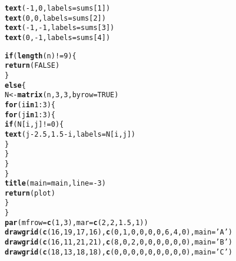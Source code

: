 \documentclass[12pt]{article}\usepackage[]{graphicx}\usepackage[]{color}
\makeatletter
\newcommand{\hlnum}[1]{\textcolor[rgb]{0.686,0.059,0.569}{#1}}%
\newcommand{\hlstr}[1]{\textcolor[rgb]{0.192,0.494,0.8}{#1}}%
\newcommand{\hlopt}[1]{\textcolor[rgb]{0,0,0}{#1}}%
\newcommand{\hlstd}[1]{\textcolor[rgb]{0.345,0.345,0.345}{#1}}%
\newcommand{\hlkwa}[1]{\textcolor[rgb]{0.161,0.373,0.58}{\textbf{#1}}}%
\newcommand{\hlkwb}[1]{\textcolor[rgb]{0.69,0.353,0.396}{#1}}%
\newcommand{\hlkwc}[1]{\textcolor[rgb]{0.333,0.667,0.333}{#1}}%
\newcommand{\hlkwd}[1]{\textcolor[rgb]{0.737,0.353,0.396}{\textbf{#1}}}%
\newenvironment{kframe}{%
 \def\at@end@of@kframe{}%
 \ifinner\ifhmode%
  \def\at@end@of@kframe{\end{minipage}}%
  \begin{minipage}{\columnwidth}%
 \fi\fi%
 \def\FrameCommand##1{\hskip\@totalleftmargin \hskip-\fboxsep
 \colorbox{shadecolor}{##1}\hskip-\fboxsep
     \hskip-\linewidth \hskip-\@totalleftmargin \hskip\columnwidth}%
 \MakeFramed {\advance\hsize-\width
   \@totalleftmargin\z@ \linewidth\hsize
   \@setminipage}}%
 {\par\unskip\endMakeFramed%
 \at@end@of@kframe}
\newenvironment{knitrout}{}{} %
\makeatother
\begin{document}
\begin{knitrout}
\begin{kframe}
\begin{alltt}
    \hlkwd{text}\hlstd{(}\hlopt{-}\hlnum{1}\hlstd{,} \hlnum{0}\hlstd{,} \hlkwc{labels} \hlstd{= sums[}\hlnum{1}\hlstd{])}
    \hlkwd{text}\hlstd{(}\hlnum{0}\hlstd{,} \hlnum{0}\hlstd{,} \hlkwc{labels} \hlstd{= sums[}\hlnum{2}\hlstd{])}
    \hlkwd{text}\hlstd{(}\hlopt{-}\hlnum{1}\hlstd{,} \hlopt{-}\hlnum{1}\hlstd{,} \hlkwc{labels} \hlstd{= sums[}\hlnum{3}\hlstd{])}
    \hlkwd{text}\hlstd{(}\hlnum{0}\hlstd{,} \hlopt{-}\hlnum{1}\hlstd{,} \hlkwc{labels} \hlstd{= sums[}\hlnum{4}\hlstd{])}

    \hlkwa{if} \hlstd{(}\hlkwd{length}\hlstd{(n)} \hlopt{!=} \hlnum{9}\hlstd{)\{}
      \hlkwd{return}\hlstd{(}\hlnum{FALSE}\hlstd{)}
    \hlstd{\}}
    \hlkwa{else}\hlstd{\{}
      \hlstd{N} \hlkwb{<-} \hlkwd{matrix}\hlstd{(n,} \hlnum{3}\hlstd{,} \hlnum{3}\hlstd{,} \hlkwc{byrow}\hlstd{=}\hlnum{TRUE}\hlstd{)}
      \hlkwa{for} \hlstd{(i} \hlkwa{in} \hlnum{1}\hlopt{:}\hlnum{3}\hlstd{)\{}
        \hlkwa{for} \hlstd{(j} \hlkwa{in} \hlnum{1}\hlopt{:}\hlnum{3}\hlstd{)\{}
          \hlkwa{if} \hlstd{(N[i, j]} \hlopt{!=} \hlnum{0}\hlstd{)\{}
            \hlkwd{text}\hlstd{(j}\hlopt{-}\hlnum{2.5}\hlstd{,} \hlnum{1.5}\hlopt{-}\hlstd{i,} \hlkwc{labels} \hlstd{= N[i, j])}
          \hlstd{\}}
        \hlstd{\}}
      \hlstd{\}}
    \hlstd{\}}
    \hlkwd{title}\hlstd{(}\hlkwc{main}\hlstd{=main,} \hlkwc{line} \hlstd{=} \hlopt{-}\hlnum{3}\hlstd{)}
    \hlkwd{return}\hlstd{(plot)}
  \hlstd{\}}
\hlstd{\}}
\hlkwd{par}\hlstd{(}\hlkwc{mfrow}\hlstd{=}\hlkwd{c}\hlstd{(}\hlnum{1}\hlstd{,} \hlnum{3}\hlstd{),} \hlkwc{mar}\hlstd{=}\hlkwd{c}\hlstd{(}\hlnum{2}\hlstd{,} \hlnum{2}\hlstd{,} \hlnum{1.5}\hlstd{,} \hlnum{1}\hlstd{))}
\hlkwd{drawgrid}\hlstd{(}\hlkwd{c}\hlstd{(}\hlnum{16}\hlstd{,} \hlnum{19}\hlstd{,} \hlnum{17}\hlstd{,} \hlnum{16}\hlstd{),} \hlkwd{c}\hlstd{(}\hlnum{0}\hlstd{,} \hlnum{1}\hlstd{,} \hlnum{0}\hlstd{,} \hlnum{0}\hlstd{,} \hlnum{0}\hlstd{,} \hlnum{0}\hlstd{,} \hlnum{6}\hlstd{,} \hlnum{4}\hlstd{,} \hlnum{0}\hlstd{),} \hlkwc{main}\hlstd{=}\hlstr{'A'}\hlstd{)}
\hlkwd{drawgrid}\hlstd{(}\hlkwd{c}\hlstd{(}\hlnum{16}\hlstd{,} \hlnum{11}\hlstd{,} \hlnum{21}\hlstd{,} \hlnum{21}\hlstd{),} \hlkwd{c}\hlstd{(}\hlnum{8}\hlstd{,} \hlnum{0}\hlstd{,} \hlnum{2}\hlstd{,} \hlnum{0}\hlstd{,} \hlnum{0}\hlstd{,} \hlnum{0}\hlstd{,} \hlnum{0}\hlstd{,} \hlnum{0}\hlstd{,} \hlnum{0}\hlstd{),} \hlkwc{main}\hlstd{=}\hlstr{'B'}\hlstd{)}
\hlkwd{drawgrid}\hlstd{(}\hlkwd{c}\hlstd{(}\hlnum{18}\hlstd{,} \hlnum{13}\hlstd{,} \hlnum{18}\hlstd{,} \hlnum{18}\hlstd{),} \hlkwd{c}\hlstd{(}\hlnum{0}\hlstd{,} \hlnum{0}\hlstd{,} \hlnum{0}\hlstd{,} \hlnum{0}\hlstd{,} \hlnum{0}\hlstd{,} \hlnum{0}\hlstd{,} \hlnum{0}\hlstd{,} \hlnum{0}\hlstd{,} \hlnum{0}\hlstd{),} \hlkwc{main}\hlstd{=}\hlstr{'C'}\hlstd{)}
\end{alltt}
\end{kframe}
\end{knitrout}
\end{document}
